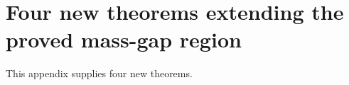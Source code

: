 \section{Four new theorems extending the proved mass-gap region}
\label{app:mass_gap_extension}

This appendix supplies four new theorems.
